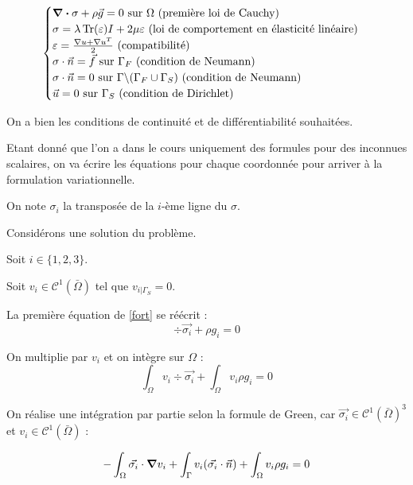 \begin{equation}\label{fort}
    \begin{cases}
      \div \sigma + \rho \vec{g} = 0 \textrm { sur $\Omega$ (première loi de Cauchy)} \\
      \sigma = \lambda \operatorname{Tr} (\varepsilon) I + 2 \mu \varepsilon \textrm { (loi de comportement en élasticité linéaire)} \\
      \varepsilon=\frac{\nabla u + \nabla u^T }{2} \textrm { (compatibilité)} \\
      \sigma \cdot \vec{n} = \vec{f}\textrm { sur $\Gamma_F$ (condition de Neumann)} \\
      \sigma \cdot \vec{n} = 0\textrm { sur $\Gamma \backslash (\Gamma_F \cup \Gamma_S) $ (condition de Neumann)} \\
      \vec{u} = 0 \textrm { sur $\Gamma_S$ (condition de Dirichlet)} \\
      
    \end{cases}
\end{equation}

On a bien les conditions de continuité et de différentiabilité souhaitées. 

Etant donné que l'on a dans le cours uniquement des formules pour des inconnues scalaires, on va écrire les équations pour chaque coordonnée pour arriver à la formulation variationnelle.

On note $\sigma_i$ la transposée de la $i$-ème ligne du $\sigma$.

Considérons une solution du problème.

Soit $i \in \{1,2,3\}$.

Soit $v_i \in \mathcal{C}^1(\bar{\Omega})$ tel que $v_{i|\Gamma_S} = 0$.



La première équation de \eqref{fort} se réécrit :
$$\div \vec{\sigma_i} + \rho g_i = 0$$

On multiplie par $v_i$ et on intègre sur $\Omega$ :
$$\int_\Omega v_i \div \vec{\sigma_i} +  \int_\Omega v_i \rho g_i = 0$$

On réalise une intégration par partie selon la formule de Green, car $\vec{\sigma_i} \in \mathcal{C}^1(\bar{\Omega})^3$ et $v_i \in \mathcal{C}^1(\bar{\Omega})$ :


\begin{equation}\label{green}
    -\int_{\Omega} \vec{\sigma_i} \cdot \grad v_i + \int_{\Gamma} v_i (\vec{\sigma_i} \cdot \vec{n}) + \int_\Omega v_i \rho g_i = 0
\end{equation}

